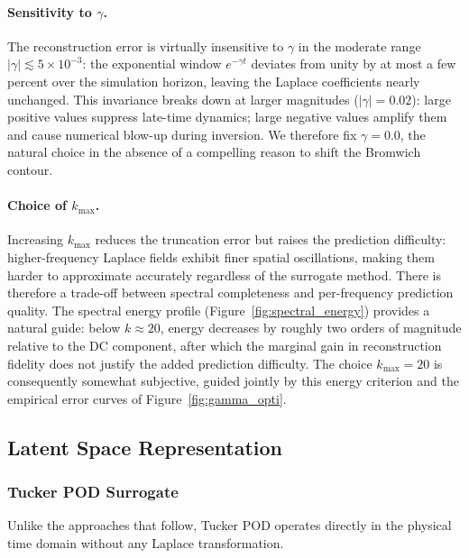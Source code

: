 \documentclass[a4paper]{article}
\begin{document}
\paragraph{Sensitivity to $\gamma$.}
The reconstruction error is virtually insensitive to $\gamma$ in the moderate range $|\gamma| \lesssim 5 \times 10^{-3}$: the exponential window $e^{-\gamma t}$ deviates from unity by at most a few percent over the simulation horizon, leaving the Laplace coefficients nearly unchanged. This invariance breaks down at larger magnitudes ($|\gamma| = 0.02$): large positive values suppress late-time dynamics; large negative values amplify them and cause numerical blow-up during inversion. We therefore fix $\gamma = 0.0$, the natural choice in the absence of a compelling reason to shift the Bromwich contour.

\paragraph{Choice of $k_{\max}$.}
Increasing $k_{\max}$ reduces the truncation error but raises the prediction difficulty: higher-frequency Laplace fields exhibit finer spatial oscillations, making them harder to approximate accurately regardless of the surrogate method. There is therefore a trade-off between spectral completeness and per-frequency prediction quality. The spectral energy profile (Figure~\ref{fig:spectral_energy}) provides a natural guide: below $k \approx 20$, energy decreases by roughly two orders of magnitude relative to the DC component, after which the marginal gain in reconstruction fidelity does not justify the added prediction difficulty. The choice $k_{\max} = 20$ is consequently somewhat subjective, guided jointly by this energy criterion and the empirical error curves of Figure~\ref{fig:gamma_opti}.

\subsection{Latent Space Representation}

\subsubsection{Tucker POD Surrogate}

Unlike the approaches that follow, Tucker POD operates directly in the physical time domain without any Laplace transformation.
\end{document}
